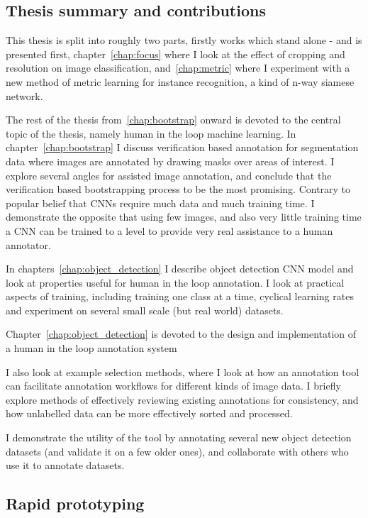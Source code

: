 \subsection {Thesis summary and contributions}

This thesis is split into roughly two parts, firstly works which stand alone - and is presented first, chapter~\ref{chap:focus} where I look at the effect of cropping and resolution on image classification, and~\ref{chap:metric} where I experiment with a new method of metric learning for instance recognition, a kind of n-way siamese network. 

The rest of the thesis from~\ref{chap:bootstrap} onward is devoted to the central topic of the thesis, namely human in the loop machine learning. In chapter~\ref{chap:bootstrap} I discuss verification based annotation for segmentation data where images are annotated by drawing masks over areas of interest. I explore several angles for assisted image annotation, and conclude that the verification based bootstrapping process to be the most promising. Contrary to popular belief that \gls{CNN}s require much data and much training time. I demonstrate the opposite that using few images, and also very little training time a \gls{CNN} can be trained to a level to provide very real assistance to a human annotator. 

In chapters~\ref{chap:object_detection} I describe  object detection \gls{CNN} model and look at properties useful for human in the loop annotation. I look at practical aspects of training, including training one class at a time, cyclical learning rates and experiment on several small scale (but real world) datasets. 


Chapter~\ref{chap:object_detection} is devoted to the design and implementation of a human in the loop annotation system 

I also look at example selection methods, where I look at how an annotation tool can facilitate annotation workflows for different kinds of image data. I briefly explore methods of effectively reviewing existing annotations for consistency, and how unlabelled data can be more effectively sorted and processed.

I demonstrate the utility of the tool by annotating several new object detection datasets (and validate it on a few older ones),  and collaborate with others who use it to annotate datasets.



\subsection {Rapid prototyping}

